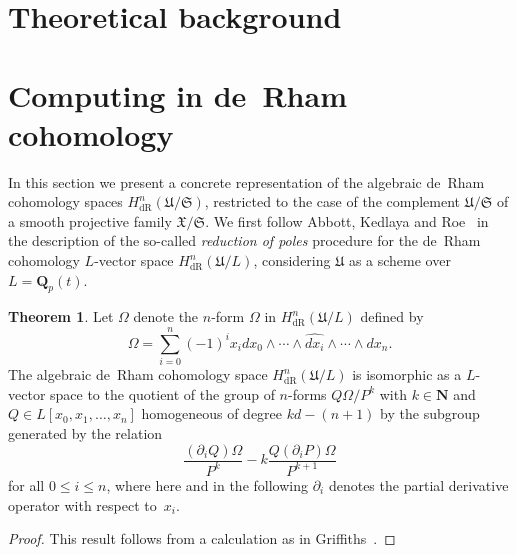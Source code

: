 \documentclass[a4paper,11pt]{article}
\numberwithin{equation}{section}
\newcommand{\NN}{\mathbf{N}} %
\newcommand{\QQ}{\mathbf{Q}} %
\providecommand{\HdR}{H_{\text{dR}}}    %
\theoremstyle{definition}
\newtheorem{thm}{Theorem}[section]
\begin{document}
\section{Theoretical background}
\label{sec:Background}


\section{Computing in de~Rham cohomology}
\label{sec:deRham}

In this section we present a concrete representation of the algebraic 
de~Rham cohomology spaces $\HdR^{n}(\mathfrak{U}/\mathfrak{S})$, 
restricted to the case of the complement $\mathfrak{U}/\mathfrak{S}$ 
of a smooth projective family $\mathfrak{X} / \mathfrak{S}$.  We first 
follow Abbott, Kedlaya and Roe~\citep[Remark~3.2.5]{AbbottKedlayaRoe2006} 
in the description of the so-called \emph{reduction of poles} procedure for 
the de~Rham cohomology $L$-vector space $\HdR^{n}(\mathfrak{U} / L)$, 
considering $\mathfrak{U}$ as a scheme over $L = \QQ_{p}(t)$.

\begin{thm}
Let $\Omega$ denote the $n$-form $\Omega$ in $\HdR^{n}(\mathfrak{U}/L)$ 
defined by 
\begin{equation}
\Omega = \sum_{i=0}^n (-1)^i x_i d x_0 \wedge \dotsb \wedge \widehat{d x_i} \wedge \dotsb \wedge d x_n.
\end{equation}
The algebraic de~Rham cohomology space $\HdR^{n}(\mathfrak{U}/L)$ is 
isomorphic as a $L$-vector space to the quotient of the group of $n$-forms 
$Q \Omega / P^k$ with $k \in \NN$ and $Q \in L[x_0, x_1, \dotsc, x_n]$ 
homogeneous of degree $k d - (n + 1)$ by the subgroup generated by the 
relation 
\begin{equation} \label{eq:deRhamRel}
\frac{(\partial_i Q) \Omega}{P^k} - k \frac{Q (\partial_i P) \Omega}{P^{k+1}}
\end{equation}
for all $0 \leq i \leq n$, where here and in the following $\partial_i$ 
denotes the partial derivative operator with respect to~$x_i$.
\end{thm}

\begin{proof}
This result follows from a calculation as 
in Griffiths~\citep[\S 4]{Griffiths1969}.
\end{proof}
\end{document}
